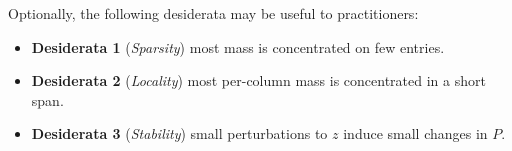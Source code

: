 
Optionally, the following desiderata may be useful to practitioners:
\begin{itemize}[noitemsep, topsep=-4pt]
  \item \textbf{Desiderata 1} (\textit{Sparsity}) most mass is concentrated on few entries.
  \item \textbf{Desiderata 2} (\textit{Locality}) most per-column mass is concentrated in a short span.
  \item \textbf{Desiderata 3} (\textit{Stability}) small perturbations to $z$ induce small changes in $P$.
\end{itemize}

